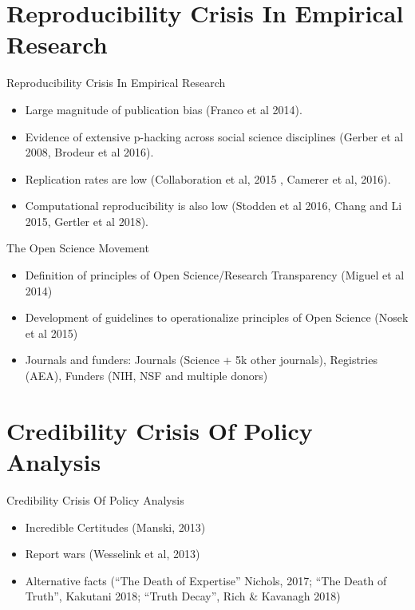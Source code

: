 \documentclass{beamer}
\begin{document}
\section[Crisis in Research]{Reproducibility Crisis In Empirical Research}

\begin{frame}{Reproducibility Crisis In Empirical Research}

\begin{itemize}
\item Large magnitude of publication bias (Franco et al 2014).  
\item Evidence of extensive p-hacking across social science disciplines (Gerber et al 2008, Brodeur et al 2016).
\item Replication rates are low (Collaboration et al, 2015 , Camerer et al, 2016). 
\item Computational reproducibility is also low (Stodden et al 2016, Chang and Li 2015, Gertler et al 2018).
\end{itemize}

\end{frame} 


\begin{frame}{The Open Science Movement}

\begin{itemize}
\item Definition of principles of Open Science/Research Transparency (Miguel et al 2014)
\item Development of guidelines to operationalize principles of Open Science (Nosek et al 2015)
\item Journals and funders: Journals (Science + 5k other journals), Registries (AEA), Funders (NIH, NSF and multiple donors)
\end{itemize}

\end{frame} 

\section[Crisis in PA]{Credibility Crisis Of Policy Analysis}

\begin{frame}{Credibility Crisis Of Policy Analysis}
\begin{itemize}
\item Incredible Certitudes  (Manski, 2013) 
\item Report wars (Wesselink et al, 2013) 
\pause
\item Alternative facts (``The Death of Expertise'' Nichols, 2017; ``The Death of Truth'', Kakutani 2018; ``Truth Decay'', Rich \& Kavanagh 2018)
\end{itemize}
\end{frame} 
\end{document}

